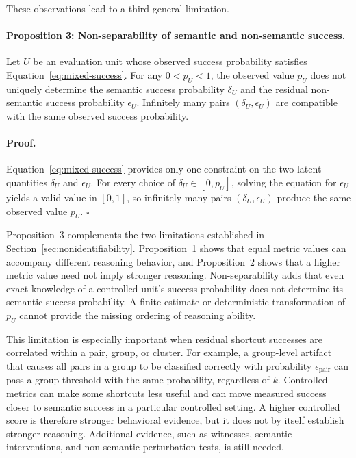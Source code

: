 \documentclass[acmsmall,screen,review,anonymous]{acmart}
\begin{document}
These observations lead to a third general limitation.

\paragraph{Proposition 3: Non-separability of semantic and non-semantic
success.}
Let \(U\) be an evaluation unit whose observed success probability satisfies
Equation~\eqref{eq:mixed-success}. For any \(0<p_U<1\), the observed value
\(p_U\) does not uniquely determine the semantic success probability
\(\delta_U\) and the residual non-semantic success probability
\(\epsilon_U\). Infinitely many pairs
\((\delta_U,\epsilon_U)\) are compatible with the same observed success
probability.

\paragraph{Proof.}
Equation~\eqref{eq:mixed-success} provides only one constraint on the two
latent quantities \(\delta_U\) and \(\epsilon_U\). For every choice of
\(\delta_U\in[0,p_U]\), solving the equation for \(\epsilon_U\) yields a
valid value in \([0,1]\), so infinitely many pairs
\((\delta_U,\epsilon_U)\) produce the same observed value \(p_U\).
\(\square\)

Proposition~3 complements the two limitations established in
Section~\ref{sec:nonidentifiability}. Proposition~1 shows that equal metric
values can accompany different reasoning behavior, and Proposition~2 shows
that a higher metric value need not imply stronger reasoning. Non-separability
adds that even exact knowledge of a controlled unit's success probability does
not determine its semantic success probability. A finite estimate or
deterministic transformation of \(p_U\) cannot provide the missing ordering of
reasoning ability.

This limitation is especially important when residual shortcut successes are
correlated within a pair, group, or cluster. For example, a group-level
artifact that causes all pairs in a group to be classified correctly with
probability \(\epsilon_{\mathrm{pair}}\) can pass a group threshold with the
same probability, regardless of \(k\). Controlled metrics can make some
shortcuts less useful and can move measured success closer to semantic
success in a particular controlled setting. A higher controlled score is
therefore stronger behavioral evidence, but it does not by itself establish
stronger reasoning. Additional evidence, such as witnesses, semantic
interventions, and non-semantic perturbation tests, is still needed.
\end{document}
